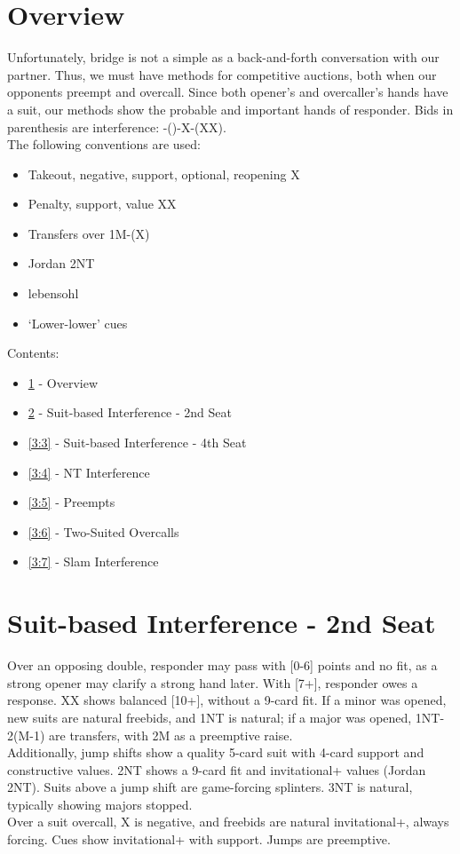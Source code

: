 \documentclass[12pt]{report}
\newcommand{\n}{\\}
\newcommand{\q}[1]{\multido{}{#1}{\qquad}}
\newcommand{\ul}[1]{\begin{itemize}#1\end{itemize}}
\newcommand{\li}[1]{\item[~] \q{#1}}
\begin{document}
\section{Overview} \label{3:1}

Unfortunately, bridge is not a simple as a back-and-forth conversation with our partner.  Thus, we must have methods for competitive auctions, both when our opponents preempt and overcall.  Since both opener's and overcaller's hands have a suit, our methods show the probable and important hands of responder.  Bids in parenthesis are interference: -()-X-(XX). \n

The following conventions are used:
\begin{itemize} \itemsep0em
    \item Takeout, negative, support, optional, reopening X
    \item Penalty, support, value XX
    \item Transfers over 1M-(X)
    \item Jordan 2NT
    \item lebensohl
    \item `Lower-lower' cues
\end{itemize}
Contents:
\ul {
    \li0 \ref{3:1} - Overview
    \li0 \ref{3:2} - Suit-based Interference - 2nd Seat
    \li0 \ref{3:3} - Suit-based Interference - 4th Seat
    \li0 \ref{3:4} - NT Interference
    \li0 \ref{3:5} - Preempts
    \li0 \ref{3:6} - Two-Suited Overcalls
    \li0 \ref{3:7} - Slam Interference
}
\newpage

\section{Suit-based Interference - 2nd Seat} \label{3:2}
    
    Over an opposing double, responder may pass with [0-6] points and no fit, as a strong opener may clarify a strong hand later.  With [7+], responder owes a response.  XX shows balanced [10+], without a 9-card fit.  If a minor was opened, new suits are natural freebids, and 1NT is natural; if a major was opened, 1NT-2(M-1) are transfers, with 2M as a preemptive raise.\n

    Additionally, jump shifts show a quality 5-card suit with 4-card support and constructive values.  2NT shows a 9-card fit and invitational+ values (Jordan 2NT).  Suits above a jump shift are game-forcing splinters.  3NT is natural, typically showing majors stopped. \n

    Over a suit overcall, X is negative, and freebids are natural invitational+, always forcing.  Cues show invitational+ with support.  Jumps are preemptive.\n
\end{document}
